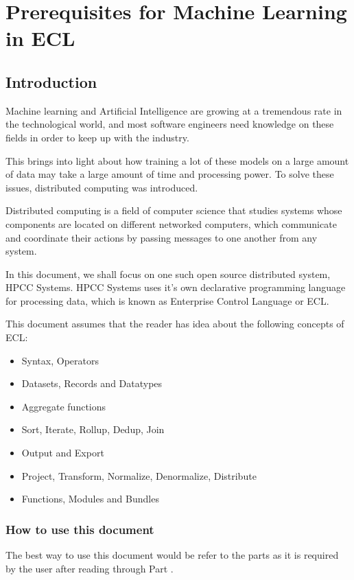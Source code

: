 
\part{Prerequisites for Machine Learning in ECL}\label{part:prereqs}

\chapter{Introduction}\label{chap:intro}

Machine learning and Artificial Intelligence are growing at a tremendous rate in the technological world, and most software engineers need knowledge on these fields in order to keep up with the industry.

This brings into light about how training a lot of these models on a large amount of data may take a large amount of time and processing power. To solve these issues, distributed computing was introduced.

Distributed computing is a field of computer science that studies systems whose components are located on different networked computers, which communicate and coordinate their actions by passing messages to one another from any system.

In this document, we shall focus on one such open source distributed system, HPCC Systems. HPCC Systems uses it's own declarative programming language for processing data, which is known as Enterprise Control Language or ECL.

This document assumes that the reader has idea about the following concepts of ECL:
\begin{itemize}
    \item Syntax, Operators
    \item Datasets, Records and Datatypes
    \item Aggregate functions
    \item Sort, Iterate, Rollup, Dedup, Join
    \item Output and Export
    \item Project, Transform, Normalize, Denormalize, Distribute
    \item Functions, Modules and Bundles
\end{itemize}

\section{How to use this document}\label{sec:howtouse}

The best way to use this document would be refer to the parts as it is required by the user after reading through Part \ref{part:prereqs}.


